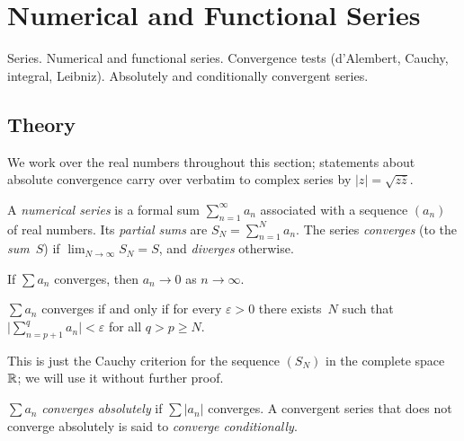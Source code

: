 
\section{Numerical and Functional Series}
\label{sec:1.1.08-series}

\begin{ticket}
Series. Numerical and functional series. Convergence tests (d'Alembert, Cauchy, integral, Leibniz). Absolutely and conditionally convergent series.
\end{ticket}

\subsection*{Theory}

We work over the real numbers throughout this section; statements
about absolute convergence carry over verbatim to complex series by
$|z| = \sqrt{z\bar{z}}$.

\begin{definition}
\label{def:series-convergence}
A \emph{numerical series} is a formal sum
$\sum_{n=1}^{\infty} a_n$ associated with a sequence $(a_n)$ of real
numbers. Its \emph{partial sums} are
$S_N = \sum_{n=1}^{N} a_n$. The series \emph{converges} (to the
\emph{sum}~$S$) if $\lim_{N \to \infty} S_N = S$, and \emph{diverges}
otherwise.
\end{definition}

\begin{proposition}
\label{prop:necessary}
If $\sum a_n$ converges, then $a_n \to 0$ as $n \to \infty$.
\end{proposition}

\begin{theorem}
\label{thm:series-cauchy}
$\sum a_n$ converges if and only if for every $\varepsilon > 0$ there
exists~$N$ such that
$\bigl|\sum_{n=p+1}^{q} a_n\bigr| < \varepsilon$ for all $q > p \ge N$.
\end{theorem}

This is just the Cauchy criterion for the sequence $(S_N)$ in the
complete space~$\mathbb{R}$; we will use it without further proof.

\begin{definition}
\label{def:abs-cond-convergence}
$\sum a_n$ \emph{converges absolutely} if $\sum |a_n|$ converges.
A convergent series that does not converge absolutely is said to
\emph{converge conditionally}.
\end{definition}


